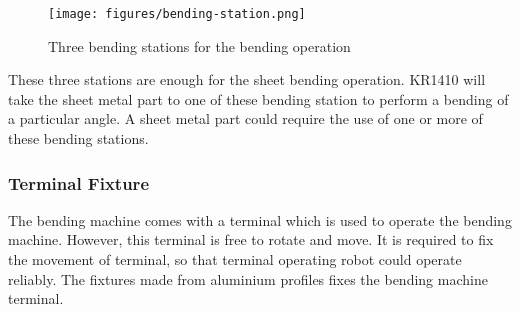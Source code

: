 \begin{figure}[h]
    \centering
    \texttt{[image: figures/bending-station.png]}
    \caption{Three bending stations for the bending operation}
    \label{fig:bending-station}
\end{figure}

These three stations are enough for the sheet bending operation. KR1410 will take the sheet metal part to one of these bending station
to perform a bending of a particular angle. A sheet metal part could require the use of one or more of these bending stations.


\subsubsection{Terminal Fixture}
The bending machine comes with a terminal which is used to operate the bending machine. However, this terminal is free to rotate and move.
It is required to fix the movement of terminal, so that terminal operating robot could operate reliably. The fixtures made from aluminium profiles fixes the bending machine
terminal.
